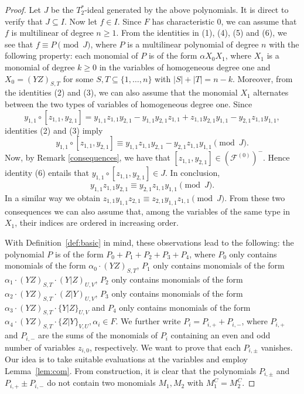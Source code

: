 \documentclass[11pt]{amsart}
\theoremstyle{definition}
\theoremstyle{remark}
\begin{document}
	\begin{proof}
		Let $J$ be the $T_2^*$-ideal generated by the above polynomials. It is direct to verify that $J\subseteq I$. Now let $f\in I$. Since $F$ has characteristic $0$, we can assume that $f$ is multilinear of degree $n\ge 1$. From the identities in (1), (4), (5) and (6), we see that $f\equiv P\pmod J$, where $P$ is a multilinear polynomial of degree $n$ with the following property: 
		each monomial of $P$ is of the form $\alpha X_0X_1$, where
		$X_1$ is a monomial of degree $k\ge 0$ in the variables of homogeneous degree one and
		$X_0=(YZ)_{S, T}$ for some $S, T\subseteq \{1, \ldots, n\}$ with $|S|+|T|=n-k$. Moreover, from the identities (2) and (3), we can also assume that the monomial $X_1$ alternates between the two types of variables of homogeneous degree one. Since 
		$$y_{1, 1}\circ [z_{1, 1}, y_{2, 1}]=y_{1, 1}z_{1, 1}y_{2, 1}-y_{1, 1}y_{2, 1}z_{1, 1}+z_{1, 1}y_{2, 1}y_{1, 1}-y_{2, 1}z_{1, 1}y_{1, 1},$$
		identities (2) and (3) imply 
		$$y_{1, 1}\circ [z_{1, 1}, y_{2, 1}]\equiv y_{1, 1}z_{1, 1}y_{2, 1}-y_{2, 1}z_{1, 1}y_{1, 1}\pmod J.$$
		Now, by Remark \ref{consequences}, we have that $ [z_{1, 1}, y_{2, 1}]\in (\mathcal{F}^{(0)})^-$. Hence identity (6) entails that $y_{1, 1}\circ [z_{1, 1}, y_{2, 1}]\in J$. In conclusion,  
		$$y_{1, 1}z_{1, 1}y_{2, 1}\equiv y_{2, 1}z_{1, 1}y_{1, 1}\pmod J.$$
		In a similar way we obtain $z_{1, 1}y_{1, 1}z_{2, 1}\equiv z_{2, 1}y_{1, 1}z_{1, 1}\pmod J.$
		From these two consequences we can also assume that, among the variables of the same type in $X_1$, their indices are ordered in increasing order. 
		
		With Definition~\ref{def:basic} in mind, these observations lead to the following: the polynomial $P$ is of the form $P_0+P_1+P_2+P_3+P_4$, where $P_0$ only contains monomials of the form $\alpha_0\cdot (YZ)_{S, T}$, $P_1$ only contains monomials of the form $\alpha_1\cdot (YZ)_{S, T}\cdot (Y|Z)_{U, V}$, $P_2$ only contains monomials of the form $\alpha_2\cdot (YZ)_{S, T}\cdot (Z|Y)_{U, V}$, $P_3$ only contains monomials of the form $\alpha_3\cdot (YZ)_{S, T}\cdot \{Y|Z\}_{U, V}$ and $P_4$ only contains monomials of the form $\alpha_4\cdot (YZ)_{S, T}\cdot  \{Z|Y\}_{V, U},\alpha_i\in F$. We further write $P_i=P_{i, +}+P_{i, -}$, where $P_{i, +}$ and $P_{i, -}$ are the sums of the monomials of $P_i$ containing an even and odd number of variables $z_{i, 0}$, respectively. We want to prove that each $P_{i, \pm}$ vanishes. Our idea is to take suitable evaluations at the variables and employ Lemma~\ref{lem:com}. From construction, it is clear that the polynomials $P_{i, \pm}$ and $P_{i, +}\pm P_{i, -}$ do not contain two monomials $M_1, M_2$ with $M_1^C=M_2^C$. 
		

\end{proof}
\end{document}
